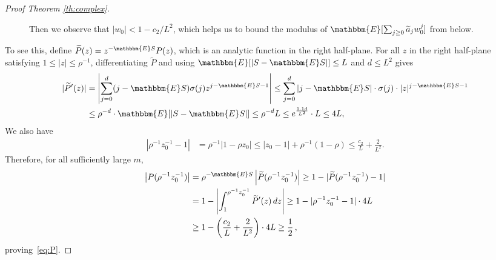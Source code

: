 \documentclass[final,12pt]{colt2018} %
\newcommand{\E}{\mathbbm{E}}
\newcommand{\1}{\mathbf{1}}
\newcommand{\wt}{\widetilde}
\def\Pt{{\wt{P}}}
\begin{document}
\begin{proof}[Proof Theorem \ref{th:complex}]
\begin{figure}[b]
{			Then we observe that $|w_0|<1-c_2/L^2$, which helps us to bound
			the modulus of $\E[\sum_{j\geq 0} \wt a_j w_0^j]$ from below.}
		\label{fig:z_0}
	\end{figure}
	To see this, define $\Pt (z) = z^{-\E S} P(z)$, which is an analytic function in the right half-plane.  For all $z$ in the
	right half-plane satisfying $1 \le |z| \le \rho^{-1}$, differentiating
	$\Pt$ and using $\E [ |S - \E S| ] \le L$ and $d \le L^2$ gives
	\begin{align*}
	|\Pt' (z)|
	& = \left| \sum_{j = 0}^{d} (j - \E S) \sigma(j) z^{j - \E S - 1} \right|
	\le \sum_{j = 0}^{d} |j - \E S|\cdot \sigma(j) \cdot |z|^{j - \E S - 1} \\
	& \le \rho^{-d} \cdot \E[ |S - \E S| ]
	\le \rho^{-d} L \le e^{\frac{1.1 d}{L^2}} \cdot L \le 4L,
	\end{align*}
	We also have
	\begin{align*}
	|\rho^{-1} z_0^{-1} - 1| &= \rho^{-1} |1 - \rho z_0| \le |z_0 - 1|
	+ \rho^{-1}(1 - \rho) \le \frac{c_2}{L}+ \frac{2}{L^2}.
	\end{align*}
	Therefore, for all sufficiently large $m$,
	\begin{align*}
	\left | P(\rho^{-1}z_0^{-1}) \right |
	&= \rho^{-\E S} \left | \wt{P}(\rho^{-1}z_0^{-1}) \right |
	\ge 1 - |\wt{P}(\rho^{-1}z_0^{-1}) - 1| \\
	&= 1 - \left| \int_1^{\rho^{-1}z_0^{-1}} \wt{P}'(z) \,dz \right|
	\ge 1 - |\rho^{-1}z_0^{-1} - 1| \cdot 4L \\
	&\ge 1-\left( \frac{c_2}{L}+ \frac{2}{L^2} \right)\cdot 4L \ge \frac{1}{2} \, ,
	\end{align*}
	proving~\eqref{eq:P}.
	

\end{proof}
\end{document}
